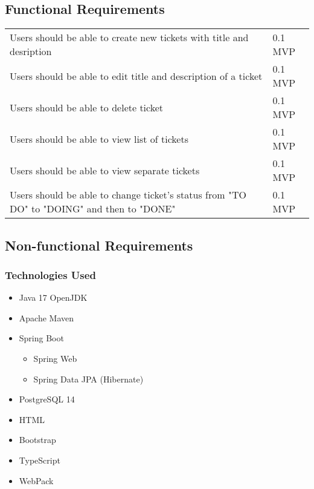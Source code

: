 \documentclass[a4paper]{article}
\begin{document}
    \subsection{Functional Requirements}
    \begin{table}[htbp]
        \centering
        \begin{tabularx}{\linewidth}{|X|l|}
            \hline
            \centering{Description} & \centering{Version} \tabularnewline \hline
            Users should be able to create new tickets with title and desription & 0.1 MVP \tabularnewline \hline
            Users should be able to edit title and description of a ticket & 0.1 MVP \tabularnewline \hline
            Users should be able to delete ticket & 0.1 MVP \tabularnewline \hline
            Users should be able to view list of tickets & 0.1 MVP \tabularnewline \hline
            Users should be able to view separate tickets & 0.1 MVP \tabularnewline \hline
            Users should be able to change ticket's status from "TO DO" to "DOING" and then to "DONE" & 0.1 MVP \tabularnewline \hline
        \end{tabularx}
    \end{table}

    \subsection{Non-functional Requirements}
    \subsubsection{Technologies Used}
    \begin{itemize}
        \item Java 17 OpenJDK
        \item Apache Maven
        \item Spring Boot
        \begin{itemize}
            \item Spring Web
            \item Spring Data JPA (Hibernate)
        \end{itemize}
        \item PostgreSQL 14
        \item HTML
        \item Bootstrap
        \item TypeScript
        \item WebPack
    \end{itemize}
\end{document}
